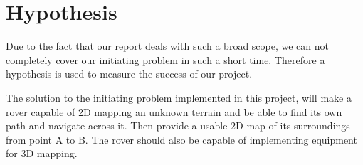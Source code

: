 \section{Hypothesis}

Due to the fact that our report deals with such a broad scope, we can not completely cover our initiating problem in such a short time. Therefore a hypothesis is used to measure the success of our project. 

The solution to the initiating problem implemented in this project, will make a rover capable of 2D mapping an unknown terrain and be able to find its own path and navigate across it. Then provide a usable 2D map of its surroundings from point A to B. The rover should also be capable of implementing equipment for 3D mapping.
